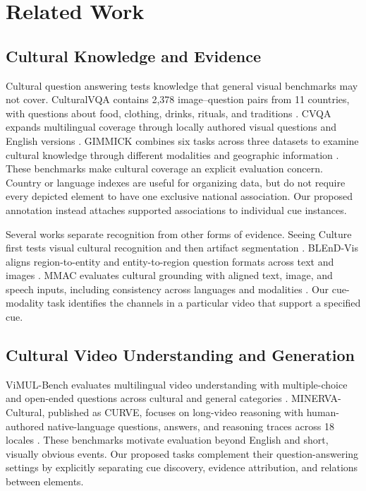 \section{Related Work}
\label{sec:related-work}


\subsection{Cultural Knowledge and Evidence}
Cultural question answering tests knowledge that general visual benchmarks may not cover.
CulturalVQA contains 2,378 image--question pairs from 11 countries, with questions about food, clothing, drinks, rituals, and traditions \citep{nayak-etal-2024-benchmarking}.
CVQA expands multilingual coverage through locally authored visual questions and English versions \citep{romero2024cvqa}.
GIMMICK combines six tasks across three datasets to examine cultural knowledge through different modalities and geographic information \citep{schneider-etal-2025-gimmick}.
These benchmarks make cultural coverage an explicit evaluation concern.
Country or language indexes are useful for organizing data, but do not require every depicted element to have one exclusive national association.
Our proposed annotation instead attaches supported associations to individual cue instances.

Several works separate recognition from other forms of evidence.
Seeing Culture first tests visual cultural recognition and then artifact segmentation \citep{satar-etal-2025-seeing}.
BLEnD-Vis aligns region-to-entity and entity-to-region question formats across text and images \citep{tan-etal-2026-blend}.
MMAC evaluates cultural grounding with aligned text, image, and speech inputs, including consistency across languages and modalities \citep{zheng-etal-2026-mmac}.
Our cue-modality task identifies the channels in a particular video that support a specified cue.

\subsection{Cultural Video Understanding and Generation}
ViMUL-Bench evaluates multilingual video understanding with multiple-choice and open-ended questions across cultural and general categories \citep{shafique-etal-2025-culturally}.
MINERVA-Cultural, published as CURVE, focuses on long-video reasoning with human-authored native-language questions, answers, and reasoning traces across 18 locales \citep{Singh_2026_CVPR}.
These benchmarks motivate evaluation beyond English and short, visually obvious events.
Our proposed tasks complement their question-answering settings by explicitly separating cue discovery, evidence attribution, and relations between elements.

